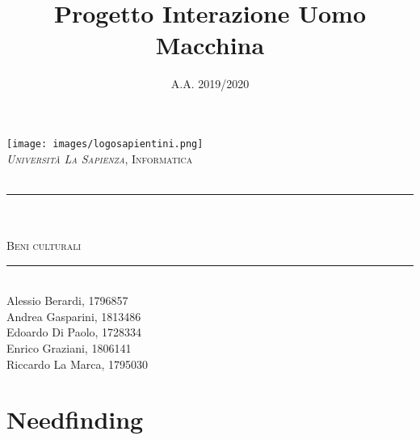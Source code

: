 \documentclass[11pt]{article}
\title{Progetto Interazione Uomo Macchina}
\date{A.A. 2019/2020}
\makeatletter
\def\projectName{Beni culturali}
\let\documentTitle\@title
\let\academicYear\@date
\makeatother
\begin{document}
\begin{titlepage}
	\centering
    \vspace*{0.5 cm}
    \texttt{[image: images/logosapientini.png]}\\[0.75 cm]
	\textsc{\textit{Università La Sapienza}, Informatica}\\[0.25 cm]
	\textsc{\academicYear}\\[0.5 cm]
	\rule{\linewidth}{0.2 mm} \\[0.4 cm]
	\textsc{\large \documentTitle}\\[0.4 cm]
	\textsc{\Huge \projectName}\\
	\rule{\linewidth}{0.2 mm} \\[1.5 cm]
	
	\large
	Alessio Berardi, 1796857\\[0.2 cm]
	Andrea Gasparini, 1813486\\[0.2 cm]
    Edoardo Di Paolo, 1728334\\[0.2 cm]
    Enrico Graziani, 1806141\\[0.2 cm]
    Riccardo La Marca, 1795030\\[0.2 cm]
\end{titlepage}

{\hypersetup{linkcolor=black}
    \tableofcontents
}
\pagebreak


\pagebreak


\pagebreak

\section{Needfinding}

\pagebreak

\pagebreak

\pagebreak


\pagebreak


\pagebreak


\end{document}
